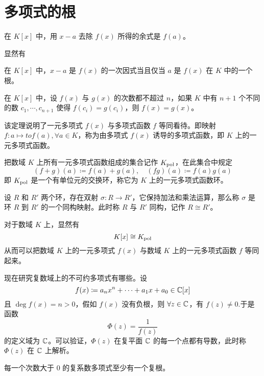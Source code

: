 \section{多项式的根}

\begin{theorem}
    在 $K[x]$ 中，用 $x-a$ 去除 $f(x)$ 所得的余式是 $f(a)$。
\end{theorem}

显然有

\begin{theorem}[Bezout 定理]
    在 $K[x]$ 中，$x-a$ 是 $f(x)$ 的一次因式当且仅当 $a$ 是 $f(x)$ 在 $K$ 中的一个根。
\end{theorem}

\begin{theorem}
    在 $K[x]$ 中，设 $f(x)$ 与 $g(x)$ 的次数都不超过 $n$，如果 $K$ 中有 $n+1$ 个不同的数 $c_1,\cdots,c_{n+1}$ 使得 $f(c_i) = g(c_i)$，则 $f(x) = g(x)$。
\end{theorem}

该定理说明了一元多项式 $f(x)$ 与多项式函数 $f$ 等同看待。即映射 $f : a \mapsto to f(a), \forall a \in K$，称为由多项式 $f(x)$ 诱导的多项式函数，即 $K$ 上的一元多项式函数。

把数域 $K$ 上所有一元多项式函数组成的集合记作 $K_{\rm pol}$，在此集合中规定
\[ (f+g)(a) \coloneqq  f(a) + g(a), \quad (fg)(a) \coloneqq  f(a)g(a) \]
即 $K_{\rm pol}$ 是一个有单位元的交换环，称它为 $K$ 上的一元多项式函数环。

\begin{definition}
    设 $R$ 和 $R'$ 两个环，存在双射 $\sigma : R \to R'$，它保持加法和乘法运算，那么称 $\sigma$ 是环 $R$ 到 $R'$ 的一个同构映射。此时称 $R$ 与 $R'$ 同构，记作 $R \cong R'$。
\end{definition}

对于数域 $K$ 上，显然有
\[K[x] \cong K_{\rm pol}\]
从而可以把数域 $K$ 上的一元多项式 $f(x)$ 与数域 $K$ 上的一元多项式函数 $f$ 等同起来。

现在研究复数域上的不可约多项式有哪些。设
\[f(x) \coloneqq a_nx^n + \cdots + a_1x + a_0 \in \mathbb{C}[x]\]
且 $\deg f(x) = n > 0$，假如 $f(x)$ 没有负根，则 $\forall z \in \mathbb{C}$，有 $f(z) \ne 0$.于是函数
\[\Phi(z) = \frac{1}{f(z)}\]
的定义域为 $\mathbb{C}$。可以验证，$\Phi(z)$ 在复平面 $\mathbb{C}$ 的每一个点都有导数，此时称 $\Phi(z)$ 在 $\mathbb{C}$ 上解析。

\begin{theorem}[代数基本定理]
    每一个次数大于 $0$ 的复系数多项式至少有一个复根。
\end{theorem}

